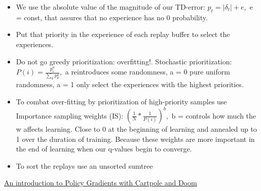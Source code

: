 \begin{itemize}
\begin{itemize}[noitemsep,nolistsep]
		\item We use the absolute value of the magnitude of our TD-error: $p_t = |\delta_t| + e$,\ e = const, that assures that no experience has no 0 probability.
		\item Put that priority in the experience of each replay buffer to select the experiences.
		\item Do not go greedy prioritization: overfitting!. Stochastic prioritization: $P(i) = \frac{p_i^a}{\sum_k p_k^a}$,\ a reintroduces some randomness, a = 0 pure uniform randomness, a = 1 only select the experiences with the highest priorities.
		\item To combat over-fitting by prioritization of high-priority samples use Importance sampling weights (IS): $(\frac{1}{N} * \frac{1}{P(i)})^b$,\  b = controls how much the w affects learning. Close to 0 at the beginning of learning and annealed up to 1 over the duration of training. Because these weights are more important in the end of learning when our q-values begin to converge.
		\item To sort the replays use an unsorted sumtree
	\end{itemize} 
\end{itemize} 
\href{https://www.freecodecamp.org/news/an-introduction-to-policy-gradients-with-cartpole-and-doom-495b5ef2207f/}{An introduction to Policy Gradients with Cartpole and Doom}
